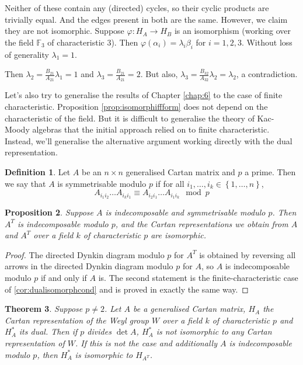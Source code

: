 \documentclass[11pt,a4paper]{report}
\newtheorem{theorem}{Theorem}[chapter]
\newtheorem{proposition}[theorem]{Proposition}
\theoremstyle{definition}
\newtheorem{definition}[theorem]{Definition}
\begin{document}
Neither of these contain any (directed) cycles, so their cyclic products are trivially equal. And the edges present in both are the same. However, we claim they are not isomorphic. Suppose $\varphi: H_A \to H_B$ is an isomorphism (working over the field $\mathbb{F}_3$ of characteristic $3$). Then $\varphi(\alpha_i) = \lambda_i \beta_i$ for $i = 1,2,3$. Without loss of generality $\lambda_1 = 1$.

Then $\lambda_2 = \frac{B_{21}}{A_{21}} \lambda_1 = 1$ and $\lambda_3 = \frac{B_{21}}{A_{21}} = 2$. But also, $\lambda_3 = \frac{B_{32}}{A_{32}} \lambda_2 = \lambda_2$, a contradiction. 

Let's also try to generalise the results of Chapter \ref{chap:6} to the case of finite characteristic. Proposition \ref{prop:isomorphiffform} does not depend on the characteristic of the field. But it is difficult to generalise the theory of Kac-Moody algebras that the initial approach relied on to finite characteristic. Instead, we'll generalise the alternative argument working directly with the dual representation.

\begin{definition}Let $A$ be an $n \times n$ generalised Cartan matrix and $p$ a prime. Then we say that $A$ is symmetrisable modulo $p$ if for all $i_1, \ldots, i_k \in \left\{1, \ldots, n\right\}$, \begin{equation*}A_{i_1i_2} \ldots A_{i_k i_1} \equiv A_{i_2i_1} \ldots A_{i_1 i_k} \mod p\end{equation*}\end{definition}

\begin{proposition}
    Suppose $A$ is indecomposable and symmetrisable modulo $p$. Then $A^T$ is indecomposable modulo $p$, and the Cartan representations we obtain from $A$ and $A^T$ over a field $k$ of characteristic $p$ are isomorphic. 
\end{proposition}

\begin{proof}
    The directed Dynkin diagram modulo $p$ for $A^T$ is obtained by reversing all arrows in the directed Dynkin diagram modulo $p$ for $A$, so $A$ is indecomposable modulo $p$ if and only if $A$ is. The second statement is the finite-characteristic case of \ref{cor:dualisomorphcond} and is proved in exactly the same way.
\end{proof}

\begin{theorem}Suppose $p \neq 2$. Let $A$ be a generalised Cartan matrix, $H_A$ the Cartan representation of the Weyl group $W$ over a field $k$ of characteristic $p$ and $H_A^*$ its dual. Then if $p$ divides $\det A$, $H_A^*$ is not isomorphic to any Cartan representation of $W$. If this is not the case and additionally $A$ is indecomposable modulo $p$, then $H_A^*$ is isomorphic to $H_{A^T}$.\end{theorem} 
\end{document}
